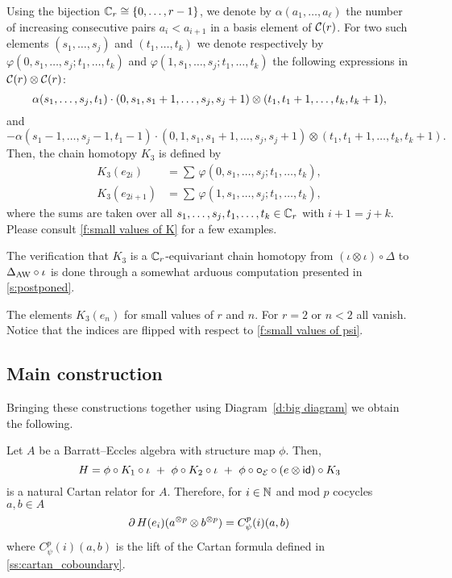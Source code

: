 Using the bijection $\mathbb{C}_r \cong \{0,\dots,r-1\}$, we denote by $\alpha(a_1,\dots,a_\ell)$ the number of increasing consecutive pairs $a_i < a_{i+1}$ in a basis element of $\mathcal{C}(r)$.
For two such elements $(s_1,\dots,s_j)$ and $(t_1,\dots,t_k)$ we denote respectively by $\varphi(0,s_1,\dots,s_j;t_1,\dots,t_k)$ and $\varphi(1,s_1,\dots,s_j;t_1,\dots,t_k)$ the following expressions in $\mathcal{C}(r) \otimes \mathcal{C}(r)$:
\[
\alpha(s_1,\dots,s_j,t_1) \cdot
(0,s_1,s_1+1,\dots,s_j,s_j+1) \otimes
(t_1,t_1+1,\dots,t_k,t_k+1),
\]
and
\[
- \alpha(s_1-1,\dots,s_j-1,t_1-1) \cdot
(0,1,s_1,s_1+1,\dots,s_j,s_j+1)\otimes (t_1,t_1+1,\dots,t_k,t_k+1).
\]
Then, the chain homotopy $K_3$ is defined by
\[
\begin{split}
	K_3(e_{2i})   &= \sum \, \varphi(0,s_1,\dots,s_j;t_1,\dots,t_k), \\
	K_3(e_{2i+1}) &= \sum \, \varphi(1,s_1,\dots,s_j;t_1,\dots,t_k),
\end{split}
\]
where the sums are taken over all $s_1,\dots,s_j,t_1,\dots,t_k \in \mathbb{C}_r$ with $i+1 = j+k$.
Please consult \cref{f:small values of K} for a few examples.

The verification that $K_3$ is a $\mathbb{C}_r$-equivariant chain homotopy from $(\iota\otimes \iota)\circ \Delta$ to $\Delta_{\operatorname{AW}}\circ \iota$ is done through a somewhat arduous computation presented in \cref{s:postponed}.

\begin{table}
	\centering
	
	\caption{The elements $K_3(e_n)$ for small values of $r$ and $n$. For $r=2$ or $n<2$ all vanish. Notice that the indices are flipped with respect to \cref{f:small values of psi}.}
	\label{f:small values of K}
\end{table}

\subsection{Main construction}

Bringing these constructions together using Diagram~\eqref{d:big diagram} we obtain the following.

\begin{theorem*}
	Let $A$ be a Barratt--Eccles algebra with structure map $\phi$.
	Then,
	\[
	H = \phi \circ K_1 \circ \iota \ +\ \phi \circ K_2 \circ \iota \ +\ \phi \circ \bcirc_{\BE} \circ (e \ot \id)\circ K_3
	\]
	is a natural Cartan relator for $A$.
	Therefore, for $i \in \mathbb{N}$ and mod $p$ cocycles $a,b \in A$
	\[
	\operatorname{\partial} H(e_i)(a^{\otimes p} \otimes b^{\otimes p}) = C_\psi^p(i)(a, b)
	\]
	where $C_\psi^p(i)(a, b)$ is the lift of the Cartan formula defined in {\rm \cref{ss:cartan_coboundary}}.
\end{theorem*}